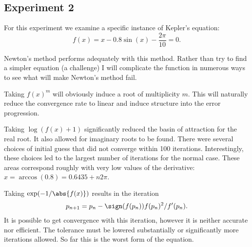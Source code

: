 \documentclass{book}
\begin{document}
\subsection{Experiment 2}

For this experiment we examine a specific instance of Kepler's equation:
\begin{equation}
f(x) = x - 0.8 \sin(x) - \frac{2 \pi}{10} = 0.
\end{equation}

Newton's method performs adequately with this method.
Rather than try to find a simpler equation (a challenge) I will complicate the function in numerous ways to see what will make Newton's method fail.

Taking $f(x)^m$ will obviously induce a root of multiplicity $m$.
This will naturally reduce the convergence rate to linear and induce structure into the error progression.

Taking $\log(f(x) + 1)$ significantly reduced the basin of attraction for the real root.
It also allowed for imaginary roots to be found.
There were several choices of initial guess that did not converge within 100 iterations.
Interestingly, these choices led to the largest number of iterations for the normal case.
These areas correspond roughly with very low values of the derivative:
$x = \arccos(0.8) = 0.6435 + n 2 \pi$.

Taking $\exp(-1/\abs{f(x)})$ results in the iteration
\begin{equation*}
p_{n+1} = p_n - \sign(f(p_n)) f(p_n)^2 / f'(p_n) .
\end{equation*}
It is possible to get convergence with this iteration, however it is neither accurate nor efficient.
The tolerance must be lowered substantially or significantly more iterations allowed.
So far this is the worst form of the equation.
\end{document}
